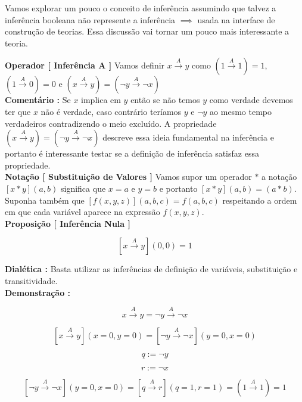 \documentclass[10pt,a4paper]{report}
\begin{document}
Vamos explorar um pouco o conceito de inferência assumindo que talvez a inferência booleana não represente a inferência $\implies$ usada na interface de construção de teorias. Essa discussão vai tornar um pouco mais interessante a teoria.

\hspace{\baselineskip}

\textbf{Operador [ Inferência A ]} Vamos definir $x \overset{A}{\rightarrow} y$ como $ (1 \overset{A}{\rightarrow} 1 )=1 $, $ (1 \overset{A}{\rightarrow} 0 )=0 $ e $ (x \overset{A}{\rightarrow} y) = ( \neg y \overset{A}{\rightarrow} \neg x ) $\\

\textbf{Comentário :} Se $x$ implica em $y$ então se não temos $y$ como verdade devemos ter que $x$ não é verdade, caso contrário teríamos $y$ e $\neg y$ ao mesmo tempo verdadeiros contradizendo o meio excluído. A propriedade $ (x \overset{A}{\rightarrow} y) = ( \neg y \overset{A}{\rightarrow} \neg x ) $ descreve essa ideia fundamental na inferência e portanto é interessante testar se a definição de inferência satisfaz essa propriedade.\\

\textbf{Notação [ Substituição de Valores ]} Vamos supor um operador $*$ a notação $[ x * y ](a,b)$ significa que $x=a$ e $y=b$ e portanto $[x*y](a,b) = (a*b)$. Suponha também que $ [ f(x,y,z) ](a,b,c) =  f(a,b,c)$ respeitando a ordem em que cada variável aparece na expressão $f(x,y,z)$.\\

\textbf{Proposição [ Inferência Nula ]} 

$$ [ x \overset{A}{\rightarrow} y ](0,0) = 1 $$

\textbf{Dialética :} Basta utilizar as inferências de definição de variáveis, substituição e transitividade.\\

\textbf{Demonstração :}

$$ x \overset{A}{\rightarrow} y = \neg y \overset{A}{\rightarrow} \neg x $$

$$ [ x\overset{A}{\rightarrow} y ](x=0,y=0) = [ \neg y \overset{A}{\rightarrow} \neg x ](y=0,x=0) $$

$$ q:=\neg y $$

$$ r:= \neg x $$

$$ [ \neg y \overset{A}{\rightarrow} \neg x ](y=0,x=0) = [ q \overset{A}{\rightarrow} r ](q=1,r=1) = (1 \overset{A}{\rightarrow} 1) = 1 $$
\end{document}
